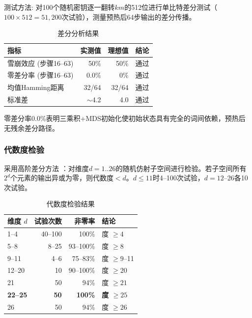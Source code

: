\documentclass[11pt,a4paper]{ctexart}
\begin{document}
测试方法: 对100个随机密钥逐一翻转$km$的512位进行单比特差分测试（$100 \times 512 = 51,200$次试验），测量预热后64步输出的差分传播。

\begin{table}[H]
\centering
\begin{tabular}{@{}lrrr@{}}
\toprule
\textbf{指标} & \textbf{实测值} & \textbf{理想值} & \textbf{结论} \\
\midrule
雪崩效应 (步骤16--63) & 50\% & 50\% & 通过 \\
零差分率 (步骤16--63) & 0.0\% & 0\% & 通过 \\
均值Hamming距离 & 32/64 & 32/64 & 通过 \\
标准差 & $\sim$4.2 & 4.0 & 通过 \\
\bottomrule
\end{tabular}
\caption{差分分析结果}
\label{tab:diff}
\end{table}

零差分率0.0\%表明三乘积+MDS初始化使初始状态具有完全的词间依赖，预热后无残余差分路径。

\subsubsection{代数度检验}

采用高阶差分方法 \cite{biham,courtois}：对维度$d=1..26$的随机仿射子空间进行检验。若子空间所有$2^d$个元素的输出异或为零，则代数度$<d$。$d\le 11$时4--100次试验，$d=12$--26各10次试验。

\begin{table}[H]
\centering
\begin{tabular}{@{}lrrl@{}}
\toprule
\textbf{维度 $d$} & \textbf{试验次数} & \textbf{非零率} & \textbf{结论} \\
\midrule
1--4  & 40--100 & 100\% & 度 $\ge 4$ \\
5--8  & 8--25   & 93--100\% & 度 $\ge 8$ \\
9--11 & 4--6    & 75--83\%  & 度 $\ge 9$--11 \\
12--20 & 10     & 90--100\% & 度 $\ge 20$ \\
21    & 50     & 94\%      & 度 $\ge 21$ \\
\textbf{22--25} & \textbf{50} & \textbf{100\%} & \textbf{度 $\ge 25$} \\
26    & 50     & 94\%      & 度 $\ge 26$ \\
\bottomrule
\end{tabular}
\caption{代数度检验结果}
\label{tab:degree}
\end{table}
\end{document}
